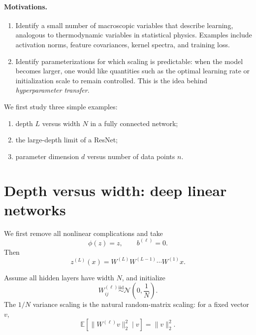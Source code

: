 \paragraph{Motivations.}
\begin{enumerate}
    \item Identify a small number of macroscopic variables that
    describe learning, analogous to thermodynamic variables in
    statistical physics.  Examples include activation norms,
    feature covariances, kernel spectra, and training loss.

    \item Identify parameterizations for which scaling is predictable:
    when the model becomes larger, one would like quantities such as
    the optimal learning rate or initialization scale to remain
    controlled.  This is the idea behind \emph{hyperparameter transfer}.
\end{enumerate}

We first study three simple examples:
\begin{enumerate}
    \item depth \(L\) versus width \(N\) in a fully connected network;
    \item the large-depth limit of a ResNet;
    \item parameter dimension \(d\) versus number of data points \(n\).
\end{enumerate}


\section{Depth versus width: deep linear networks}

We first remove all nonlinear complications and take
\[
\phi(z)=z,
\qquad
b^{(\ell)}=0.
\]
Then
\begin{equation}
    z^{(L)}(x)
    =
    W^{(L)}W^{(L-1)}\cdots W^{(1)}x.
\end{equation}

Assume all hidden layers have width \(N\), and initialize
\begin{equation}
    W_{ij}^{(\ell)}
    \overset{\mathrm{iid}}{\sim}
    \mathcal{N}\!\left(0,\frac{1}{N}\right).
\end{equation}
The \(1/N\) variance scaling is the natural random-matrix scaling:
for a fixed vector \(v\),
\begin{equation}
    \mathbb{E}\left[
        \|W^{(\ell)}v\|_2^2
        \mid v
    \right]
    =
    \|v\|_2^2.
\end{equation}


